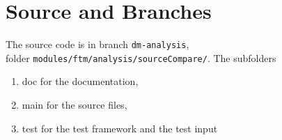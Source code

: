 \documentclass[12pt,a4paper]{report}
\begin{document}
\chapter{Source and Branches}
The source code is in branch \texttt{dm-analysis}, \\ 
folder \texttt{modules/ftm/analysis/sourceCompare/}. The subfolders
\begin{enumerate}
	\item doc for the documentation,
	\item main for the source files,
	\item test for the test framework and the test input
\end{enumerate}
\end{document}
